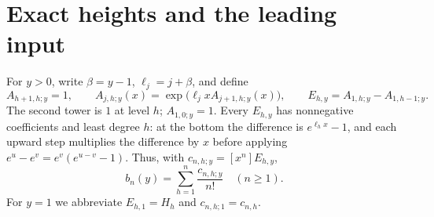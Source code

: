 \documentclass[11pt]{article}
\theoremstyle{remark}\newtheorem{remark}[theorem]{Remark}
\begin{document}
\section{Exact heights and the leading input}\label{xtw:frac:sec:input}
For $y>0$, write $\beta=y-1$, $\ell_j=j+\beta$, and define
\begin{equation}\label{xtw:frac:eq:finite}
 A_{h+1,h;y}=1,\qquad
 A_{j,h;y}(x)=\exp\bigl(\ell_jxA_{j+1,h;y}(x)\bigr),\qquad
 E_{h,y}=A_{1,h;y}-A_{1,h-1;y}.
\end{equation}
The second tower is $1$ at level $h$; $A_{1,0;y}=1$.
Every $E_{h,y}$ has nonnegative coefficients and least degree $h$:
at the bottom the difference is $e^{\ell_hx}-1$, and each upward step
multiplies the difference by $x$ before applying
$e^u-e^v=e^v(e^{u-v}-1)$. Thus, with $c_{n,h;y}=[x^n]E_{h,y}$,
\begin{equation}\label{xtw:frac:eq:heightsum}
 b_n(y)=\sum_{h=1}^n\frac{c_{n,h;y}}{n!}\quad(n\ge1).
\end{equation}
For $y=1$ we abbreviate $E_{h,1}=H_h$ and $c_{n,h;1}=c_{n,h}$.
\end{document}
